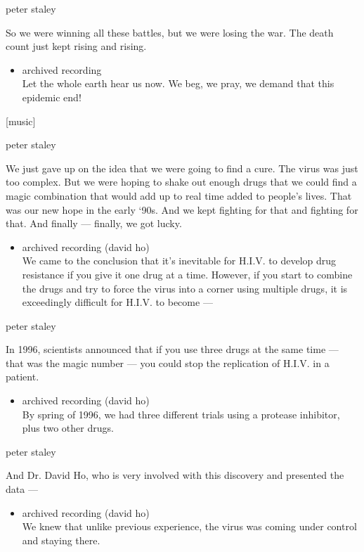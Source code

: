 peter staley

So we were winning all these battles, but we were losing the war. The
death count just kept rising and rising.

\begin{itemize}
\tightlist
\item
  archived recording\\
  Let the whole earth hear us now. We beg, we pray, we demand that this
  epidemic end!
\end{itemize}

{[}music{]}

peter staley

We just gave up on the idea that we were going to find a cure. The virus
was just too complex. But we were hoping to shake out enough drugs that
we could find a magic combination that would add up to real time added
to people's lives. That was our new hope in the early `90s. And we kept
fighting for that and fighting for that. And finally --- finally, we got
lucky.

\begin{itemize}
\tightlist
\item
  archived recording (david ho)\\
  We came to the conclusion that it's inevitable for H.I.V. to develop
  drug resistance if you give it one drug at a time. However, if you
  start to combine the drugs and try to force the virus into a corner
  using multiple drugs, it is exceedingly difficult for H.I.V. to become
  ---
\end{itemize}

peter staley

In 1996, scientists announced that if you use three drugs at the same
time --- that was the magic number --- you could stop the replication of
H.I.V. in a patient.

\begin{itemize}
\tightlist
\item
  archived recording (david ho)\\
  By spring of 1996, we had three different trials using a protease
  inhibitor, plus two other drugs.
\end{itemize}

peter staley

And Dr. David Ho, who is very involved with this discovery and presented
the data ---

\begin{itemize}
\tightlist
\item
  archived recording (david ho)\\
  We knew that unlike previous experience, the virus was coming under
  control and staying there.
\end{itemize}

